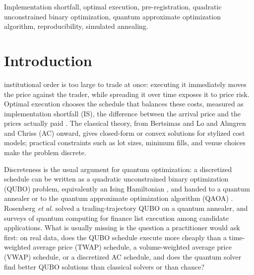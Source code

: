 \documentclass[journal]{IEEEtran}
\begin{document}
\begin{IEEEkeywords}
Implementation shortfall, optimal execution, pre-registration, quadratic unconstrained binary
optimization, quantum approximate optimization algorithm, reproducibility, simulated
annealing.
\end{IEEEkeywords}

\section{Introduction}
\label{sec:intro}

 institutional order is too large to trade at once: executing it
immediately moves the price against the trader, while spreading it over time exposes it to
price risk. Optimal execution chooses the schedule that balances these costs, measured as
implementation shortfall (IS), the difference between the arrival price and the prices
actually paid \cite{perold1988}. The classical theory, from Bertsimas and Lo
\cite{bertsimas1998} and Almgren and Chriss (AC) \cite{almgren2001} onward, gives closed-form
or convex solutions for stylized cost models; practical constraints such as lot sizes,
minimum fills, and venue choices make the problem discrete.

Discreteness is the usual argument for quantum optimization: a discretized schedule can be
written as a quadratic unconstrained binary optimization (QUBO) problem, equivalently an
Ising Hamiltonian \cite{lucas2014}, and handed to a quantum annealer \cite{kadowaki1998} or
to the quantum approximate optimization algorithm (QAOA) \cite{farhi2014}. Rosenberg
\emph{et al.} \cite{rosenberg2016} solved a trading-trajectory QUBO on a quantum annealer,
and surveys of quantum computing for finance \cite{orus2019,egger2020} list execution among
candidate applications. What is usually missing is the question a practitioner would ask
first: on real data, does the QUBO schedule execute more cheaply than a time-weighted average
price (TWAP) schedule, a volume-weighted average price (VWAP) schedule, or a discretized AC
schedule, and does the quantum solver find better QUBO solutions than classical solvers or
than chance?
\end{document}
